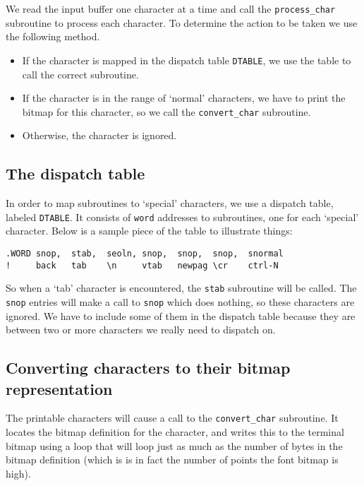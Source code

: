 \documentclass[11pt]{article}
\begin{document}
We read the input buffer one character at a time and call the \verb|process_char| subroutine to process each character. To determine the action to be taken we use the following method.

\begin{itemize}
\item
    If the character is mapped in the dispatch table \verb|DTABLE|, we use the table to call the correct subroutine.
\item
    If the character is in the range of `normal' characters, we have to print the bitmap for this character, so we call the \verb|convert_char| subroutine.
\item
    Otherwise, the character is ignored.
\end{itemize}

\subsection{The dispatch table}

In order to map subroutines to `special' characters, we use a dispatch table, labeled \verb|DTABLE|. It consists of \verb|word| addresses to subroutines, one for each `special' character. Below is a sample piece of the table to illustrate things:

\begin{verbatim}
.WORD snop,  stab,  seoln, snop,  snop,  snop,  snormal
!     back   tab    \n     vtab   newpag \cr    ctrl-N
\end{verbatim}

So when a `tab' character is encountered, the \verb|stab| subroutine will be called. The \verb|snop| entries will make a call to \verb|snop| which does nothing, so these characters are ignored. We have to include some of them in the dispatch table because they are between two or more characters we really need to dispatch on.

\subsection{Converting characters to their bitmap representation}

The printable characters will cause a call to the \verb|convert_char| subroutine. It locates the bitmap definition for the character, and writes this to the terminal bitmap using a loop that will loop just as much as the number of bytes in the bitmap definition (which is is in fact the number of points the font bitmap is high).
\end{document}
